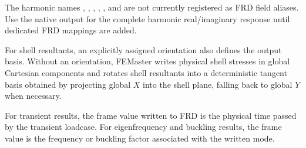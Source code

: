 The harmonic names , , , , , and  are not currently registered as FRD field aliases. Use the native  output for the complete harmonic real/imaginary response until dedicated FRD mappings are added.

For shell resultants, an explicitly assigned  orientation also defines the output basis. Without an orientation, FEMaster writes physical shell stresses in global Cartesian components and rotates shell resultants into a deterministic tangent basis obtained by projecting global \(X\) into the shell plane, falling back to global \(Y\) when necessary.

For transient results, the frame value written to FRD is the physical time passed by the transient loadcase. For eigenfrequency and buckling results, the frame value is the frequency or buckling factor associated with the written mode.

